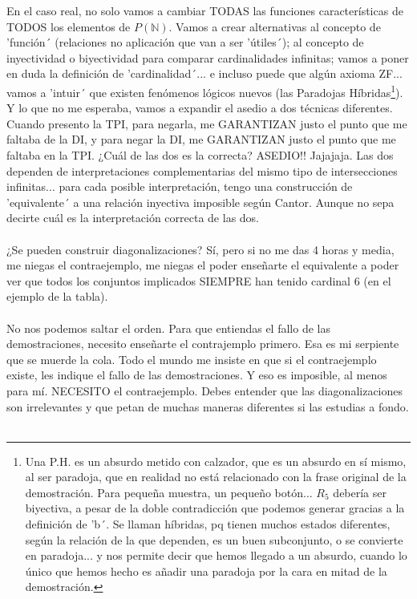 	\noindent
	En el caso real, no solo vamos a cambiar TODAS las funciones características de TODOS los elementos de $P(\mathbb{N})$. Vamos a crear alternativas al concepto de 'función´ (relaciones no aplicación que van a ser 'útiles´); al concepto de inyectividad o biyectividad para comparar cardinalidades infinitas; vamos a poner en duda la definición de 'cardinalidad´... e incluso puede que algún axioma ZF... vamos a 'intuir´ que existen fenómenos lógicos nuevos (las Paradojas Híbridas\footnote{Una P.H. es un absurdo metido con calzador, que es un absurdo en sí mismo, al ser paradoja, que en realidad no está relacionado con la frase original de la demostración. Para pequeña muestra, un pequeño botón... $R_{5}$ debería ser biyectiva, a pesar de la doble contradicción que podemos generar gracias a la definición de 'b´. Se llaman híbridas, pq tienen muchos estados diferentes, según la relación de la que dependen, es un buen subconjunto, o se convierte en paradoja... y nos permite decir que hemos llegado a un absurdo, cuando lo único que hemos hecho es añadir una paradoja por la cara en mitad de la demostración.}). Y lo que no me esperaba, vamos a expandir el asedio a dos técnicas diferentes. Cuando presento la TPI, para negarla, me GARANTIZAN justo el punto que me faltaba de la DI, y para negar la DI, me GARANTIZAN justo el punto que me faltaba en la TPI. ¿Cuál de las dos es la correcta? ASEDIO!! Jajajaja. Las dos dependen de interpretaciones complementarias del mismo tipo de intersecciones infinitas... para cada posible interpretación, tengo una construcción de 'equivalente´ a una relación inyectiva imposible según Cantor. Aunque no sepa decirte cuál es la interpretación correcta de las dos.\\\\

	\noindent
	¿Se pueden construir diagonalizaciones? Sí, pero si no me das 4 horas y media, me niegas el contraejemplo, me niegas el poder enseñarte el equivalente a poder ver que todos los conjuntos implicados SIEMPRE han tenido cardinal 6 (en el ejemplo de la tabla).\\\\
	
	\noindent
	No nos podemos saltar el orden. Para que entiendas el fallo de las demostraciones, necesito enseñarte el contrajemplo primero. Esa es mi serpiente que se muerde la cola.	Todo el mundo me insiste en que si el contraejemplo existe, les indique el fallo de las demostraciones. Y eso es imposible, al menos para mí. NECESITO el contraejemplo. Debes entender que las diagonalizaciones son irrelevantes y que petan de muchas maneras diferentes si las estudias a fondo.
	\\\\
	
